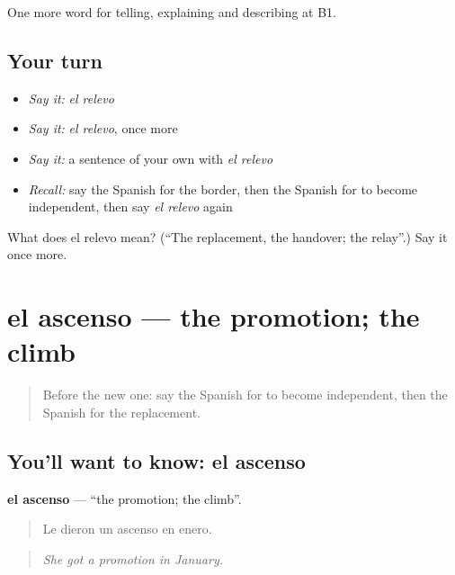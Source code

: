 \begin{grammarlens}[title={What you've built}]
One more word for telling, explaining and describing at B1.
\end{grammarlens}

\subsection*{Your turn}
\begin{itemize}
\raggedright
  \item \emph{Say it:} \emph{el relevo}
  \item \emph{Say it:} \emph{el relevo}, once more
  \item \emph{Say it:} a sentence of your own with \emph{el relevo}
  \item \emph{Recall:} say the Spanish for the border, then the Spanish for to become independent, then say \emph{el relevo} again
\end{itemize}

\begin{tcolorbox}[breakable,colback=teal!4,colframe=teal!35!black,title={Before you move on}]
What does el relevo mean? (\textquotedblleft{}The replacement, the handover; the relay\textquotedblright{}.) Say it once more.
\end{tcolorbox}
\section[el ascenso]{el ascenso — the promotion; the climb}

\label{lesson:ES-C553-ascenso}



\begin{quote}
Before the new one: say the Spanish for to become independent, then the Spanish for the replacement.
\end{quote}

\subsection*{You'll want to know: el ascenso}
\textbf{el ascenso} — \textquotedblleft{}the promotion; the climb\textquotedblright{}.

\begin{quote}
Le dieron un ascenso en enero.
\end{quote}

\begin{quote}
\emph{She got a promotion in January.}
\end{quote}

